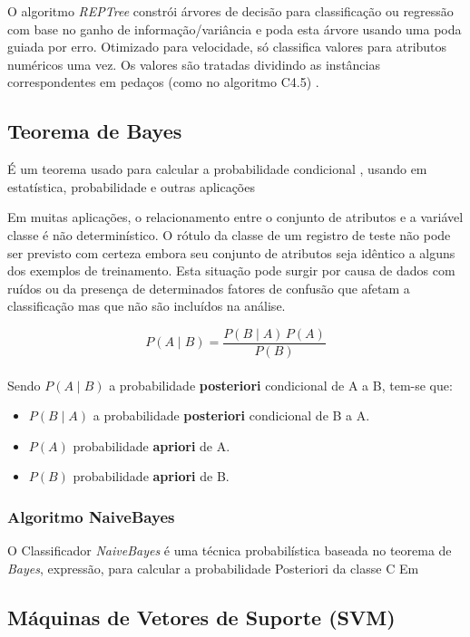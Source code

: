 \documentclass[
	12pt,				%
	openright,			%
	oneside,	
	a4paper,				%
	english,				%
	brazil				%
]{abntex2/abntex2} %
\begin{document}
	O algoritmo \textit{REPTree} constrói árvores de decisão para classificação ou regressão  com base no ganho de informação/variância e poda esta árvore usando uma poda guiada por erro. Otimizado para velocidade, só classifica valores para atributos numéricos uma vez. Os valores são tratadas dividindo as instâncias correspondentes em pedaços (como no algoritmo C4.5) \cite{witten:2011}.
			
	\subsection{Teorema de Bayes}
	
	É um teorema usado para calcular a probabilidade condicional , usando em estatística, probabilidade e outras aplicações
	
	Em muitas aplicações, o relacionamento entre o conjunto de atributos e a variável classe é não determinístico. O rótulo da classe de um registro de teste não pode ser previsto com certeza embora seu conjunto de atributos seja idêntico a alguns dos exemplos de treinamento. Esta situação pode surgir por causa de dados com ruídos ou da presença de determinados fatores de confusão que afetam a classificação mas que não são incluídos na análise.
	
	\begin{equation}
		 P(A \mid B) = \frac{P(B \mid A) \, P(A)}{P(B)} 
	\end{equation}
	\\
	Sendo $ P(A\mid B) $ a probabilidade \textbf{posteriori} condicional de A a B, tem-se que:
	\begin{itemize}
		\item $P(B \mid A) $ a probabilidade \textbf{posteriori} condicional de B a A.
		\item $P(A) $ probabilidade \textbf{apriori} de A.
		\item $P(B )$ probabilidade \textbf{apriori} de B.
	\end{itemize}
	
	\subsubsection{Algoritmo NaiveBayes}
	
	O Classificador \textit{NaiveBayes} é uma técnica probabilística baseada no teorema de \textit{Bayes}, expressão, para calcular a probabilidade Posteriori da classe C
	Em \cite{john:1995}
	
	\subsection{Máquinas de Vetores de Suporte (SVM)}
	
\end{document}
